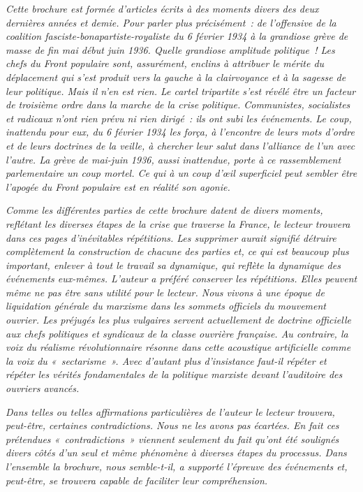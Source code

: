 \documentclass[french,twoside]{book} %
\newcommand\chaptercont{} %
\begin{document}
\chaptercont
\noindent  \emph{Cette brochure est formée d’articles écrits à des moments divers des deux dernières années et demie. Pour parler plus précisément : de l’offensive de la coalition fasciste-bonapartiste-royaliste du 6 février 1934 à la grandiose grève de masse de fin mai début juin 1936. Quelle grandiose amplitude politique ! Les chefs du Front populaire sont, assurément, enclins à attribuer le mérite du déplacement qui s’est produit vers la gauche à la clairvoyance et à la sagesse de leur politique. Mais il n’en est rien. Le cartel tripartite s’est révélé être un facteur de troisième ordre dans la marche de la crise politique. Communistes, socialistes et radicaux n’ont rien prévu ni rien dirigé : ils ont subi les événements. Le coup, inattendu pour eux, du 6 février 1934 les força, à l’encontre de leurs mots d’ordre et de leurs doctrines de la veille, à chercher leur salut dans l’alliance de l’un avec l’autre. La grève de mai-juin 1936, aussi inattendue, porte à ce rassemblement parlementaire un coup mortel. Ce qui à un coup d’œil superficiel peut sembler être l’apogée du Front populaire est en réalité son agonie.} \par
 \emph{Comme les différentes parties de cette brochure datent de divers moments, reflétant les diverses étapes de la crise que traverse la France,  le lecteur trouvera dans ces pages d’inévitables répétitions. Les supprimer aurait signifié détruire complètement la construction de chacune des parties et, ce qui est beaucoup plus important, enlever à tout le travail sa dynamique, qui reflète la dynamique des événements eux-mêmes. L’auteur a préféré conserver les répétitions. Elles peuvent même ne pas être sans utilité pour le lecteur. Nous vivons à une époque de liquidation générale du marxisme dans les sommets officiels du mouvement ouvrier. Les préjugés les plus vulgaires servent actuellement de doctrine officielle aux chefs politiques et syndicaux de la classe ouvrière française. Au contraire, la voix du réalisme révolutionnaire résonne dans cette acoustique artificielle comme la voix du « sectarisme ». Avec d’autant plus d’insistance faut-il \emph{répéter} et \emph{répéter} les vérités fondamentales de la politique marxiste devant l’auditoire des ouvriers avancés.} \par
 \emph{Dans telles ou telles affirmations particulières de l’auteur le lecteur trouvera, peut-être, certaines contradictions. Nous ne les avons pas écartées. En fait ces prétendues « contradictions » viennent seulement du fait qu’ont été soulignés divers côtés d’un seul et même phénomène à diverses étapes du processus. Dans l’ensemble la brochure, nous semble-t-il, a supporté l’épreuve des événements et, peut-être, se trouvera capable de faciliter leur compréhension.} \par
\end{document}

